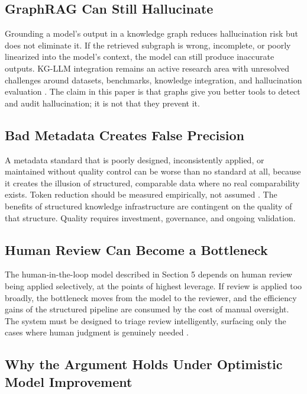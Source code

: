 \documentclass[man,12pt,donotrepeattitle]{apa7}
\begin{document}
\subsection{GraphRAG Can Still Hallucinate}

Grounding a model's output in a knowledge graph reduces hallucination risk
but does not eliminate it. If the retrieved subgraph is wrong, incomplete,
or poorly linearized into the model's context, the model can still produce
inaccurate outputs. KG-LLM integration remains an active research area with
unresolved challenges around datasets, benchmarks, knowledge integration,
and hallucination evaluation \parencite{lavrinovics2024}. The claim in this
paper is that graphs give you better tools to detect and audit hallucination;
it is not that they prevent it.

\subsection{Bad Metadata Creates False Precision}

A metadata standard that is poorly designed, inconsistently applied, or
maintained without quality control can be worse than no standard at all,
because it creates the illusion of structured, comparable data where no real
comparability exists. Token reduction should be measured empirically, not
assumed \parencite{trim2024}. The benefits of structured knowledge
infrastructure are contingent on the quality of that structure. Quality
requires investment, governance, and ongoing validation.

\subsection{Human Review Can Become a Bottleneck}

The human-in-the-loop model described in Section 5 depends on human review
being applied selectively, at the points of highest leverage. If review is
applied too broadly, the bottleneck moves from the model to the reviewer,
and the efficiency gains of the structured pipeline are consumed by the cost
of manual oversight. The system must be designed to triage review
intelligently, surfacing only the cases where human judgment is genuinely
needed \parencite{tsaneva2025}.

\subsection{Why the Argument Holds Under Optimistic Model Improvement}
\end{document}
